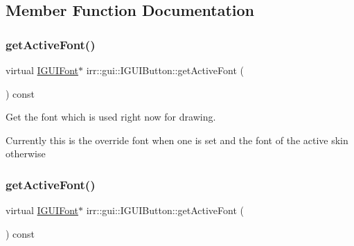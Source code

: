 \subsection{Member Function Documentation}
\mbox{\label{classirr_1_1gui_1_1IGUIButton_a1caa9253c284c3e3366733bf7805d762}} 
\subsubsection{\texorpdfstring{get\+Active\+Font()}{getActiveFont()}\hspace{0.1cm}{\footnotesize\ttfamily [1/2]}}
{\footnotesize\ttfamily virtual \hyperlink{classirr_1_1gui_1_1IGUIFont}{I\+G\+U\+I\+Font}$\ast$ irr\+::gui\+::\+I\+G\+U\+I\+Button\+::get\+Active\+Font (\begin{DoxyParamCaption}{ }\end{DoxyParamCaption}) const\hspace{0.3cm}{\ttfamily [pure virtual]}}



Get the font which is used right now for drawing. 

Currently this is the override font when one is set and the font of the active skin otherwise \mbox{\label{classirr_1_1gui_1_1IGUIButton_a1caa9253c284c3e3366733bf7805d762}} 
\subsubsection{\texorpdfstring{get\+Active\+Font()}{getActiveFont()}\hspace{0.1cm}{\footnotesize\ttfamily [2/2]}}
{\footnotesize\ttfamily virtual \hyperlink{classirr_1_1gui_1_1IGUIFont}{I\+G\+U\+I\+Font}$\ast$ irr\+::gui\+::\+I\+G\+U\+I\+Button\+::get\+Active\+Font (\begin{DoxyParamCaption}{ }\end{DoxyParamCaption}) const\hspace{0.3cm}{\ttfamily [pure virtual]}}



